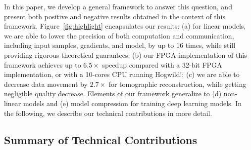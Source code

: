 \documentclass{article}
\begin{document}
In this paper, we develop a general 
framework to answer this question, and
present both  positive and negative results
 obtained in the context of this framework. 
 Figure~\ref{fig:highlight} encapsulates our results: 
(a) for linear models, we are able to lower the precision of both computation and communication, including input samples, gradients, and model, by up to $16$ times, while still providing rigorous theoretical guarantees; 
(b) our FPGA implementation of this framework achieves up to $6.5\times$ speedup compared with
a 32-bit FPGA implementation, or with a 10-cores CPU running Hogwild!;  
(c) we are able to decrease data movement by $2.7\times$ for
tomographic reconstruction, while getting negligible quality decrease. 
Elements of our framework generalize to (d) non-linear models and  (e) model compression for training deep learning models. 
In the following, we describe our technical contributions in more detail. 



\vspace{-0.5em}
\subsection{Summary of Technical Contributions}
\end{document}
